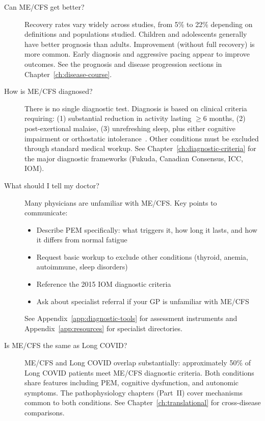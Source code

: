 \begin{description}
\item[Can ME/CFS get better?]
Recovery rates vary widely across studies, from 5\% to 22\% depending on
definitions and populations studied. Children and adolescents generally have
better prognosis than adults. Improvement (without full recovery) is more
common. Early diagnosis and aggressive pacing appear to improve outcomes.
See the prognosis and disease progression sections in
Chapter~\ref{ch:disease-course}.

\item[How is ME/CFS diagnosed?]
There is no single diagnostic test. Diagnosis is based on clinical criteria
requiring: (1) substantial reduction in activity lasting $\geq$6 months,
(2) post-exertional malaise, (3) unrefreshing sleep, plus either cognitive
impairment or orthostatic intolerance~\cite{IOM2015}. Other conditions must
be excluded through standard medical workup. See
Chapter~\ref{ch:diagnostic-criteria} for the major diagnostic frameworks
(Fukuda, Canadian Consensus, ICC, IOM).

\item[What should I tell my doctor?]
Many physicians are unfamiliar with ME/CFS. Key points to communicate:
\begin{itemize}
    \item Describe PEM specifically: what triggers it, how long it lasts,
      and how it differs from normal fatigue
    \item Request basic workup to exclude other conditions (thyroid, anemia,
      autoimmune, sleep disorders)
    \item Reference the 2015 IOM diagnostic criteria~\cite{IOM2015}
    \item Ask about specialist referral if your GP is unfamiliar with ME/CFS
\end{itemize}
See Appendix~\ref{app:diagnostic-tools} for assessment instruments and
Appendix~\ref{app:resources} for specialist directories.

\item[Is ME/CFS the same as Long COVID?]
ME/CFS and Long COVID overlap substantially: approximately 50\% of Long COVID
patients meet ME/CFS diagnostic criteria. Both conditions share features
including PEM, cognitive dysfunction, and autonomic symptoms. The
pathophysiology chapters (Part~II) cover mechanisms common to both conditions.
See Chapter~\ref{ch:translational} for cross-disease comparisons.


\end{description}
